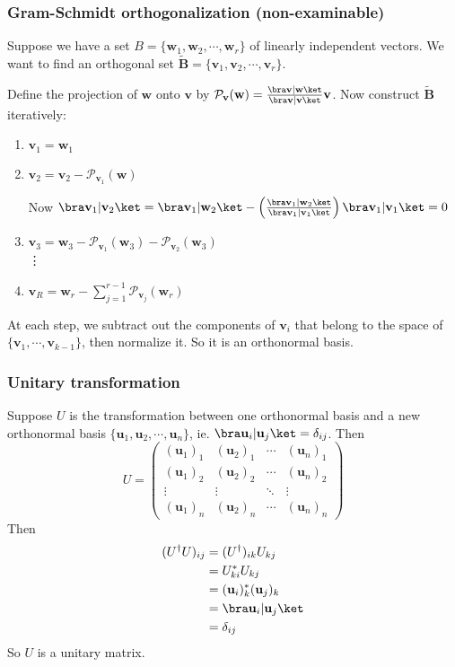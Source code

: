 \documentclass[a4paper]{article}
\begin{document}
  \subsubsection{Gram-Schmidt orthogonalization (non-examinable)}
  Suppose we have a set $B = \{\mathbf{w}_1, \mathbf{w}_2, \cdots, \mathbf{w}_r\}$ of linearly independent vectors. We want to find an orthogonal set $\tilde{\mathbf{B}} = \{\mathbf{v}_1, \mathbf{v}_2, \cdots, \mathbf{v}_r\}$.

  Define the projection of $\mathbf{w}$ onto $\mathbf{v}$ by $\mathcal{P}_\mathbf{v}(\mathbf{w}) = \frac{\bra \mathbf{v}|\mathbf{w}\ket}{\bra \mathbf{v}|\mathbf{v}\ket} \mathbf{v}$. Now construct $\tilde{\mathbf{B}}$ iteratively:
  \begin{enumerate}
    \item $\mathbf{v}_1 = \mathbf{w}_1$
    \item $\mathbf{v}_2 = \mathbf{v}_2 - \mathcal{P}_{\mathbf{v}_1}(\mathbf{w})$

      \note Now $\bra \mathbf{v}_1|\mathbf{v}_2\ket = \bra \mathbf{v}_1|\mathbf{w}_2\ket - \left(\frac{\bra \mathbf{v}_1|\mathbf{w}_2\ket}{\bra \mathbf{v}_1 | \mathbf{v}_1\ket}\right) \bra \mathbf{v}_1|\mathbf{v}_1\ket = 0$
    \item $\mathbf{v}_3 = \mathbf{w}_3 - \mathcal{P}_{\mathbf{v}_1}(\mathbf{w}_3) - \mathcal{P}_{\mathbf{v}_2}(\mathbf{w}_3)$\\
      \vdots
    \item $\displaystyle \mathbf{v}_R = \mathbf{w}_r - \sum_{j = 1}^{r - 1} \mathcal{P}_{\mathbf{v}_j}(\mathbf{w}_r)$
  \end{enumerate}
  At each step, we subtract out the components of $\mathbf{v}_i$ that belong to the space of $\{\mathbf{v}_1, \cdots, \mathbf{v}_{k - 1}\}$, then normalize it. So it is an orthonormal basis.

  \subsubsection{Unitary transformation}
  Suppose $U$ is the transformation between one orthonormal basis and a new orthonormal basis $\{\mathbf{u}_1, \mathbf{u}_2, \cdots, \mathbf{u}_n\}$, ie. $\bra \mathbf{u}_i| \mathbf{u}_j\ket = \delta_{ij}$. Then
  \[
    U = 
    \begin{pmatrix}
      (\mathbf{u}_1)_1 & (\mathbf{u}_2)_1 & \cdots & (\mathbf{u}_n)_1\\
      (\mathbf{u}_1)_2 & (\mathbf{u}_2)_2 & \cdots & (\mathbf{u}_n)_2\\
      \vdots & \vdots & \ddots & \vdots\\
      (\mathbf{u}_1)_n & (\mathbf{u}_2)_n & \cdots & (\mathbf{u}_n)_n
    \end{pmatrix}
  \]
  Then 
  \begin{align*}
    (U^\dagger U)_{ij} &= (U^\dagger)_{ik}U_{kj}\\
    &= U_{ki}^* U_{kj}\\
    &= (\mathbf{u}_i)^*_k(\mathbf{u}_j)_k\\
    &= \bra \mathbf{u}_i | \mathbf{u}_j \ket\\
    &= \delta_{ij}
  \end{align*}
  So $U$ is a unitary matrix.
\end{document}
